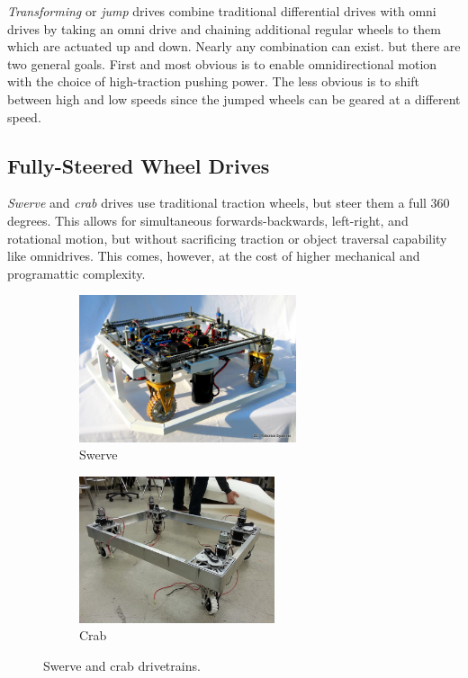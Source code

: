 \documentclass[10pt,letterpaper]{book}
\begin{document}
\textit{Transforming} or \textit{jump} drives combine traditional differential drives with omni drives by taking an omni drive and chaining additional regular wheels to them which are actuated up and down. Nearly any combination can exist. but there are two general goals. First and most obvious is to enable omnidirectional motion with the choice of high-traction pushing power. The less obvious is to shift between high and low speeds since the jumped wheels can be geared at a different speed.

\subsection{Fully-Steered Wheel Drives}

\textit{Swerve} and \textit{crab} drives use traditional traction wheels, but steer them a full 360 degrees. This allows for simultaneous forwards-backwards, left-right, and rotational motion, but without sacrificing traction or object traversal capability like omnidrives. This comes, however, at the cost of higher mechanical and programattic complexity.

\begin{figure}[H]
\begin{subfigure}[b]{.45\linewidth}
	\includegraphics[height=1.7in]{imgs/drivetrain_crab.jpeg}
	\caption{Swerve}
\end{subfigure}\begin{subfigure}[b]{.45\linewidth}
	\includegraphics[height=1.7in]{imgs/drivetrain_swerve.jpeg}
	\caption{Crab}
\end{subfigure}
\caption{Swerve and crab drivetrains.}
\end{figure}
\end{document}

